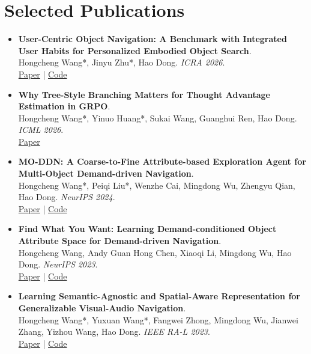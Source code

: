 \documentclass[a4paper,10pt]{article}
\begin{document}
\section*{Selected Publications}
\begin{itemize}
    \item \textbf{User-Centric Object Navigation: A Benchmark with Integrated User Habits for Personalized Embodied Object Search}.\\
    Hongcheng Wang*, Jinyu Zhu*, Hao Dong. \textit{ICRA 2026}.\\
    \href{https://arxiv.org/abs/2602.06459}{Paper} \;|\; \href{https://github.com/whcpumpkin/User-Centric-Object-Navigation}{Code}

    \item \textbf{Why Tree-Style Branching Matters for Thought Advantage Estimation in GRPO}.\\
    Hongcheng Wang*, Yinuo Huang*, Sukai Wang, Guanghui Ren, Hao Dong. \textit{ICML 2026}.\\
    \href{https://arxiv.org/abs/2509.24494}{Paper}

    \item \textbf{MO-DDN: A Coarse-to-Fine Attribute-based Exploration Agent for Multi-Object Demand-driven Navigation}.\\
    Hongcheng Wang*, Peiqi Liu*, Wenzhe Cai, Mingdong Wu, Zhengyu Qian, Hao Dong. \textit{NeurIPS 2024}.\\
    \href{https://arxiv.org/abs/2410.03488}{Paper} \;|\; \href{https://github.com/whcpumpkin/MO-DDN}{Code}

    \item \textbf{Find What You Want: Learning Demand-conditioned Object Attribute Space for Demand-driven Navigation}.\\
    Hongcheng Wang, Andy Guan Hong Chen, Xiaoqi Li, Mingdong Wu, Hao Dong. \textit{NeurIPS 2023}.\\
    \href{https://arxiv.org/abs/2309.081383}{Paper} \;|\; \href{https://github.com/whcpumpkin/Demand-driven-navigation}{Code}

    \item \textbf{Learning Semantic-Agnostic and Spatial-Aware Representation for Generalizable Visual-Audio Navigation}.\\
    Hongcheng Wang*, Yuxuan Wang*, Fangwei Zhong, Mingdong Wu, Jianwei Zhang, Yizhou Wang, Hao Dong. \textit{IEEE RA-L 2023}.\\
    \href{https://arxiv.org/abs/2304.10773}{Paper} \;|\; \href{https://github.com/wwwwwyyyyyxxxxx/SA2GVAN}{Code}
\end{itemize}
\end{document}
